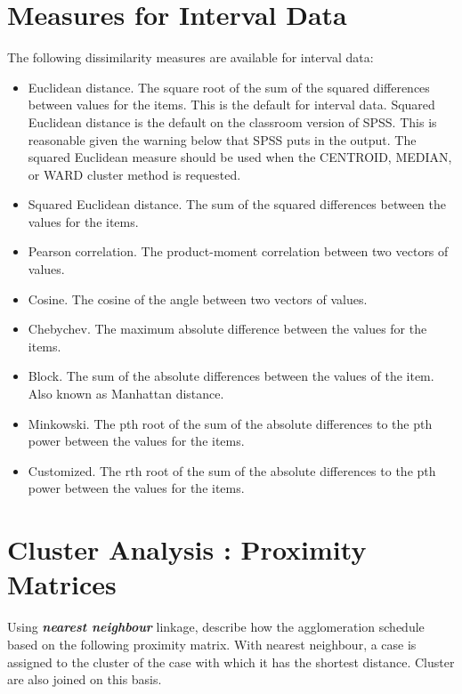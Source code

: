\documentclass[a4paper,12pt]{article}
\begin{document}
\section*{Measures for Interval Data}
The following dissimilarity measures are available for interval data:
\begin{itemize}
	
	\item Euclidean distance. The square root of the sum of the squared differences between values for the items. This is the default for interval data. {Squared Euclidean distance is the default on the classroom version of SPSS.  This is reasonable given the warning below that SPSS puts in the output.} 
	The squared Euclidean measure should be used when the CENTROID, MEDIAN, or WARD cluster method is requested.
	\item 	Squared Euclidean distance. The sum of the squared differences between the values for the items. 
	\item 	Pearson correlation. The product-moment correlation between two vectors of values. 
	\item 	Cosine. The cosine of the angle between two vectors of values. 
	\item 	Chebychev. The maximum absolute difference between the values for the items. 
	\item 	Block. The sum of the absolute differences between the values of the item. Also known as Manhattan distance. 
	\item 	Minkowski. The pth root of the sum of the absolute differences to the pth power between the values for the items. 
	\item 	Customized. The rth root of the sum of the absolute differences to the pth power between the values for the items.
\end{itemize}
\section{Cluster Analysis : Proximity Matrices}

Using \textbf{\textit{nearest neighbour}} linkage, describe how the agglomeration schedule based on the following 
proximity matrix. With nearest neighbour, a case is assigned to the cluster of the case with which it has the shortest distance. Cluster are also joined on this basis.
\end{document}
